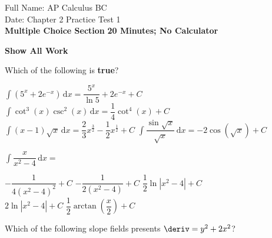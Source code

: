 \pagecolor{gray!10}%
Full Name: \hfill AP Calculus BC \\[22pt]
Date: \hfill Chapter 2 Practice Test 1 \\[22pt]
\textbf{Multiple Choice Section} \hfill \textbf{20 Minutes; No Calculator} \\[11pt]

\begin{center}
    \textbf{Show All Work}
\end{center} \vspace{11pt}

\begin{questions}
    \question Which of the following is \textbf{true}? \\

    \begin{oneparchoices}
        \choice $\int \left(5^x + 2e^{-x}\right) \,\mathrm{d}x = \dfrac{5^x}{\ln 5} + 2e^{-x} + C$
        \choice $\int \cot^3 (x)\csc^2 (x) \,\mathrm{d}x = \dfrac{1}{4}\cot^4 (x) + C$ \\[11pt]
        \makebox[0.035\textwidth] \choice $\int (x - 1)\sqrt{x} \,\mathrm{d}x = \dfrac{2}{3}x^{\frac{3}{2}} - \dfrac{1}{2}x^{\frac{1}{2}} + C$
        \makebox[0.15\textwidth] \choice $\int \dfrac{\sin \sqrt{x}}{\sqrt{x}} \,\mathrm{d}x = -2\cos \left(\sqrt{x}\right) + C$
    \end{oneparchoices} \par \horizontalline

    \question $\int \dfrac{x}{x^2 - 4} \,\mathrm{d}x = $ \\
    
    \begin{oneparchoices}
        \choice $-\dfrac{1}{4\left(x^2 - 4\right)^2} + C$
        \choice $-\dfrac{1}{2\left(x^2 - 4\right)} + C$
        \choice $\dfrac{1}{2}\ln |x^2 - 4| + C$ \\[11pt]
        \makebox[0.21\textwidth] \choice $2\ln |x^2 - 4| + C$ 
        \makebox[0.23\textwidth] \choice $\dfrac{1}{2}\arctan \left(\dfrac{x}{2}\right) + C$
    \end{oneparchoices} \par \horizontalline

    \newpage

    \question Which of the following slope fields presents $\deriv = y^2 + 2x^2$? \\


\end{questions}
